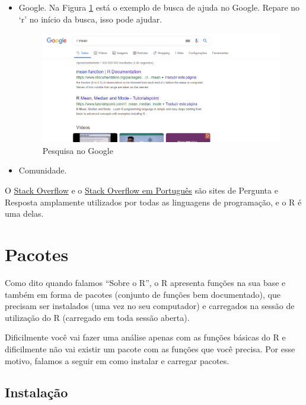 \documentclass[
]{book}
\providecommand{\tightlist}{%
  \setlength{\itemsep}{0pt}\setlength{\parskip}{0pt}}
\begin{document}
\begin{itemize}
\tightlist
\item
  Google.
  Na Figura \ref{fig:help} está o exemplo de busca de ajuda no Google. Repare no `r' no início da busca, isso pode ajudar.

  \begin{figure}
  \includegraphics[width=1\linewidth]{figures/help_R} \caption{\label{fig:help}Pesquisa no Google}\label{fig:help}
  \end{figure}
\item
  Comunidade.
\end{itemize}

O \href{https://stackoverflow.com/}{Stack Overflow} e o \href{https://pt.stackoverflow.com/}{Stack Overflow em Português} são sites de Pergunta e Resposta amplamente utilizados por todas as linguagens de programação, e o R é uma delas.

\hypertarget{pacotes}{%
\section{Pacotes}\label{pacotes}}

Como dito quando falamos ``Sobre o R'', o R apresenta funções na sua base e também em forma de pacotes (conjunto de funções bem documentado), que precisam ser instalados (uma vez no seu computador) e carregados na sessão de utilização do R (carregado em toda sessão aberta).

Dificilmente você vai fazer uma análise apenas com as funções básicas do R e dificilmente não vai existir um pacote com as funções que você precisa. Por esse motivo, falamos a seguir em como instalar e carregar pacotes.

\hypertarget{instalauxe7uxe3o}{%
\subsection{Instalação}\label{instalauxe7uxe3o}}
\end{document}
